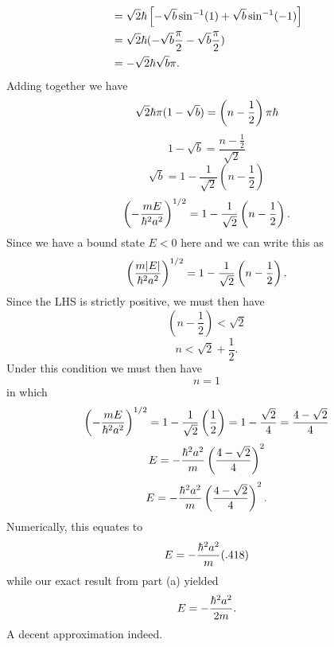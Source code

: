 \documentclass[11pt,letterpaper]{article}
\begin{document}
\begin{enumerate}
\begin{enumerate}
\begin{align*}
&=\sqrt 2\hbar\left[-\sqrt b\sin^{-1}(1)+\sqrt b\sin^{-1}(-1)\right]\\
&=\sqrt 2\hbar(-\sqrt b\frac{\pi}{2}-\sqrt b\frac{\pi}{2})\\
&=-\sqrt 2\hbar\sqrt b\pi.
\end{align*}
Adding together we have
$$\sqrt 2 \hbar\pi(1-\sqrt b) = \left(n-\frac{1}{2}\right)\pi\hbar$$
$$1-\sqrt b=\frac{n-\frac{1}{2}}{\sqrt 2}$$
$$\sqrt b = 1-\frac{1}{\sqrt 2}\left(n-\frac{1}{2}\right)$$
$$\left(-\frac{mE}{\hbar^2a^2}\right)^{1/2} = 1-\frac{1}{\sqrt 2}\left(n-\frac{1}{2}\right).$$
Since we have a bound state $E<0$ here and we can write this as
$$\left(\frac{m|E|}{\hbar^2a^2}\right)^{1/2} = 1-\frac{1}{\sqrt 2}\left(n-\frac{1}{2}\right).$$
Since the LHS is strictly positive, we must then have
$$\left(n-\frac{1}{2}\right)<\sqrt 2$$
$$n<\sqrt 2+\frac{1}{2}.$$
Under this condition we must then have 
$$n=1$$
in which
$$\left(-\frac{mE}{\hbar^2a^2}\right)^{1/2} = 1-\frac{1}{\sqrt 2}\left(\frac{1}{2}\right)= 1-\frac{\sqrt 2}{4} = \frac{4-\sqrt{2}}{4}$$
$$E=-\frac{\hbar^2a^2}{m}\left(\frac{4-\sqrt 2}{4}\right)^2$$
$$E=-\frac{\hbar^2a^2}{m}\left(\frac{4-\sqrt 2}{4}\right)^2.$$
Numerically, this equates to
$$E = -\frac{\hbar^2a^2}{m}(.418)$$
while our exact result from part (a) yielded
$$E = -\frac{\hbar^2a^2}{2m}.$$
A decent approximation indeed.
\end{enumerate}
\end{enumerate}
\end{document}
